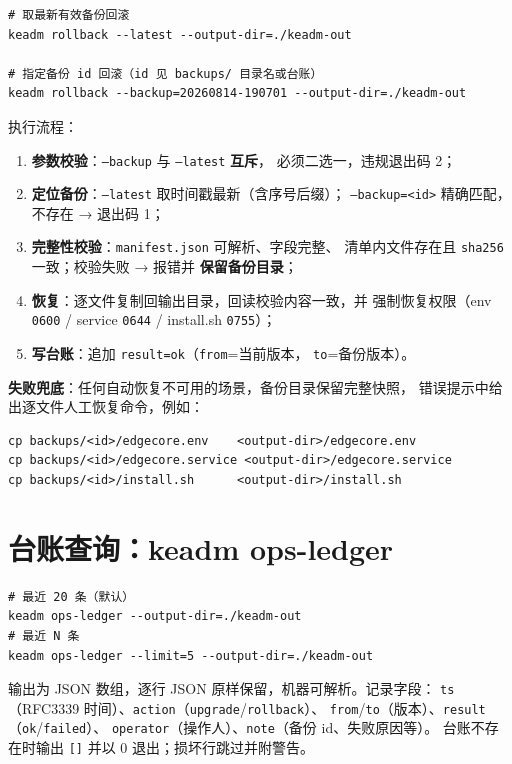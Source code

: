 \begin{lstlisting}
# 取最新有效备份回滚
keadm rollback --latest --output-dir=./keadm-out

# 指定备份 id 回滚（id 见 backups/ 目录名或台账）
keadm rollback --backup=20260814-190701 --output-dir=./keadm-out
\end{lstlisting}

执行流程：

\begin{enumerate}
  \item \textbf{参数校验}：\texttt{--backup} 与 \texttt{--latest} \textbf{互斥}，
        必须二选一，违规退出码 2；
  \item \textbf{定位备份}：\texttt{--latest} 取时间戳最新（含序号后缀）；
        \texttt{--backup=<id>} 精确匹配，不存在 → 退出码 1；
  \item \textbf{完整性校验}：\texttt{manifest.json} 可解析、字段完整、
        清单内文件存在且 \texttt{sha256} 一致；校验失败 → 报错并
        \textbf{保留备份目录}；
  \item \textbf{恢复}：逐文件复制回输出目录，回读校验内容一致，并
        强制恢复权限（env \texttt{0600} / service \texttt{0644} /
        install.sh \texttt{0755}）；
  \item \textbf{写台账}：追加 \texttt{result=ok}（\texttt{from}=当前版本，
        \texttt{to}=备份版本）。
\end{enumerate}

\textbf{失败兜底}：任何自动恢复不可用的场景，备份目录保留完整快照，
错误提示中给出逐文件人工恢复命令，例如：

\begin{lstlisting}
cp backups/<id>/edgecore.env    <output-dir>/edgecore.env
cp backups/<id>/edgecore.service <output-dir>/edgecore.service
cp backups/<id>/install.sh      <output-dir>/install.sh
\end{lstlisting}

\section{台账查询：keadm ops-ledger}

\begin{lstlisting}
# 最近 20 条（默认）
keadm ops-ledger --output-dir=./keadm-out
# 最近 N 条
keadm ops-ledger --limit=5 --output-dir=./keadm-out
\end{lstlisting}

输出为 JSON 数组，逐行 JSON 原样保留，机器可解析。记录字段：
\texttt{ts}（RFC3339 时间）、\texttt{action}（\texttt{upgrade}/\texttt{rollback}）、
\texttt{from}/\texttt{to}（版本）、\texttt{result}（\texttt{ok}/\texttt{failed}）、
\texttt{operator}（操作人）、\texttt{note}（备份 id、失败原因等）。
台账不存在时输出 \texttt{[]} 并以 0 退出；损坏行跳过并附警告。

